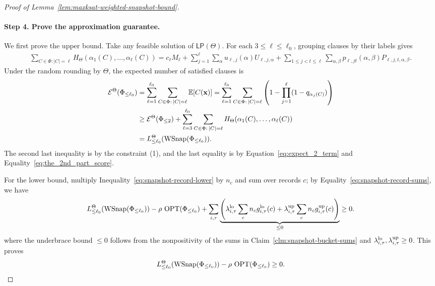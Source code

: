 \begin{proof}[Proof of Lemma~\ref{lem:maxksat-weighted-snapshot-bound}]
\paragraph{Step 4. Prove the approximation guarantee.}
We first  prove the upper bound. Take any feasible solution of $\mathsf{LP}(\Theta)$. 
For each $3\le\ell\le\ell_0$, grouping clauses by their labels gives
\begin{equation}
  \label{eq:the_2nd_part_score}
  \begin{aligned}
  \sum_{C\in\Phi: |C|=\ell} H_\Theta(\alpha_1(C),\ldots,\alpha_\ell(C))
  =c_\ell M_\ell+\!\sum_{j=1}^\ell\sum_\alpha u_{\ell,j}(\alpha)U_{\ell,j,\alpha}
  +\sum_{1\le j<t\le\ell}\sum_{\alpha,\beta}
    p_{\ell,jt}(\alpha,\beta)P_{\ell,j,t,\alpha,\beta}.
\end{aligned}
\end{equation}
Under the  random  rounding by $\Theta$, the expected number of satisfied clauses is
\[
\begin{aligned}
  \mathcal E^\Theta(\Phi_{\le\ell_0})
  &=\sum_{\ell=1}^{\ell_0}\sum_{C\in\Phi:\,|C|=\ell}\mathbb E[C(\mathbf{x})]
  =\sum_{\ell=1}^{\ell_0}\sum_{C\in\Phi:\,|C|=\ell}
    \left(1-\prod_{j=1}^\ell(1-q_{\alpha_j(C)})\right)\\
  &\ge \mathcal{E}^{\Theta}(\Phi_{\le 2})
    +\sum_{\ell=3}^{\ell_0}\sum_{C\in\Phi:\,|C|=\ell}
      H_\Theta(\alpha_1(C),\ldots,\alpha_\ell(C))\\
  &=L_{\le\ell_0}^\Theta(\operatorname{WSnap}(\Phi_{\le\ell_0})).
\end{aligned}
\]
The second last inequality is by the constraint  (1), and the last equality is by Equation~\eqref{eq:expect_2_term} and Equality~\eqref{eq:the_2nd_part_score}.





For the lower bound, multiply Inequality~\eqref{eq:snapshot-record-lower} by $n_c$ and sum over records $c$; by  Equality~\eqref{eq:snapshot-record-sums}, we have
\[
\begin{aligned}
  L_{\le\ell_0}^\Theta(\operatorname{WSnap}(\Phi_{\le\ell_0}))-\rho\,\operatorname{OPT}(\Phi_{\le\ell_0})+ \sum_{i,\tau} \underbrace{  \left(
    \lambda^{\rm lo}_{i,\tau}\sum_c n_cg^{\rm lo}_{i,\tau}(c)
    +\lambda^{\rm up}_{i,\tau}\sum_c n_cg^{\rm up}_{i,\tau}(c)\right)}_{\le 0}  \ge 0.
\end{aligned}
\]
where the underbrace bound $\le 0$ follows from the nonpositivity of the sums in Claim~\ref{clm:snapshot-bucket-sums} and $\lambda^{\rm lo}_{i,\tau},\lambda^{\rm up}_{i,\tau}\ge 0$. This proves \[L_{\le\ell_0}^\Theta(\operatorname{WSnap}(\Phi_{\le\ell_0}))-\rho\,\operatorname{OPT}(\Phi_{\le\ell_0})\ge 0.\]



\end{proof}
